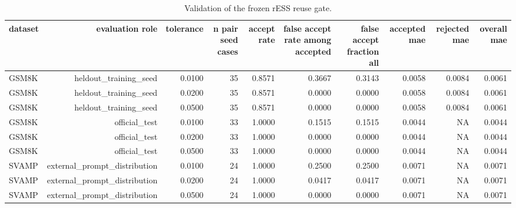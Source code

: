 \begin{table}[t]
\centering
\small
\caption{Validation of the frozen rESS reuse gate.}
\label{tab:frozen\_gate\_validation}
\begin{tabular}{lrrrrrrrrr}
\toprule
dataset & evaluation role & tolerance & n pair seed cases & accept rate & false accept rate among accepted & false accept fraction all & accepted mae & rejected mae & overall mae \\
\midrule
GSM8K & heldout\_training\_seed & 0.0100 & 35 & 0.8571 & 0.3667 & 0.3143 & 0.0058 & 0.0084 & 0.0061 \\
GSM8K & heldout\_training\_seed & 0.0200 & 35 & 0.8571 & 0.0000 & 0.0000 & 0.0058 & 0.0084 & 0.0061 \\
GSM8K & heldout\_training\_seed & 0.0500 & 35 & 0.8571 & 0.0000 & 0.0000 & 0.0058 & 0.0084 & 0.0061 \\
GSM8K & official\_test & 0.0100 & 33 & 1.0000 & 0.1515 & 0.1515 & 0.0044 & NA & 0.0044 \\
GSM8K & official\_test & 0.0200 & 33 & 1.0000 & 0.0000 & 0.0000 & 0.0044 & NA & 0.0044 \\
GSM8K & official\_test & 0.0500 & 33 & 1.0000 & 0.0000 & 0.0000 & 0.0044 & NA & 0.0044 \\
SVAMP & external\_prompt\_distribution & 0.0100 & 24 & 1.0000 & 0.2500 & 0.2500 & 0.0071 & NA & 0.0071 \\
SVAMP & external\_prompt\_distribution & 0.0200 & 24 & 1.0000 & 0.0417 & 0.0417 & 0.0071 & NA & 0.0071 \\
SVAMP & external\_prompt\_distribution & 0.0500 & 24 & 1.0000 & 0.0000 & 0.0000 & 0.0071 & NA & 0.0071 \\
\bottomrule
\end{tabular}
\end{table}
